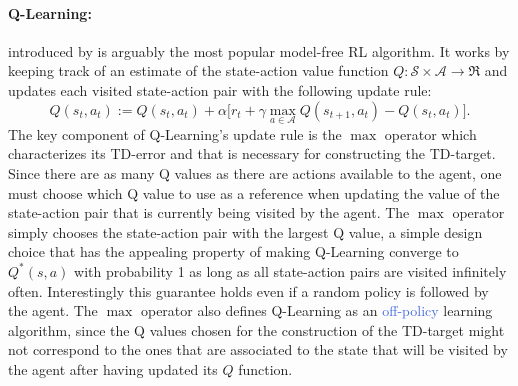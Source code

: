 \paragraph{Q-Learning:} introduced by \citet{watkins1992q} is arguably the most popular model-free RL algorithm. It works by keeping track of an estimate of the state-action value function $Q: \mathcal{S} \times \mathcal{A} \rightarrow \Re$ and updates each visited state-action pair with the following update rule:
\begin{equation}
Q(s_t,a_t):=Q(s_t,a_t) + \alpha\big[r_t + \gamma \underset{a\in \mathcal{A}}{\max} Q(s_{t+1},a_t) - Q(s_t, a_t) \big].
\label{eq:q_learning}
\end{equation}
The key component of Q-Learning's update rule is the $\max$ operator which characterizes its TD-error and that is necessary for constructing the TD-target. Since there are as many Q values as there are actions available to the agent, one must choose which Q value to use as a reference when updating the value of the state-action pair that is currently being visited by the agent. The $\max$ operator simply chooses the state-action pair with the largest Q value, a simple design choice that has the appealing property of making Q-Learning converge to $Q^{*}(s,a)$ with probability 1 as long as all state-action pairs are visited infinitely often. Interestingly this guarantee holds even if a random policy is followed by the agent. The $\max$ operator also defines Q-Learning as an \textcolor{RoyalBlue}{off-policy} learning algorithm, since the Q values chosen for the construction of the TD-target might not correspond to the ones that are associated to the state that will be visited by the agent after having updated its $Q$ function.

